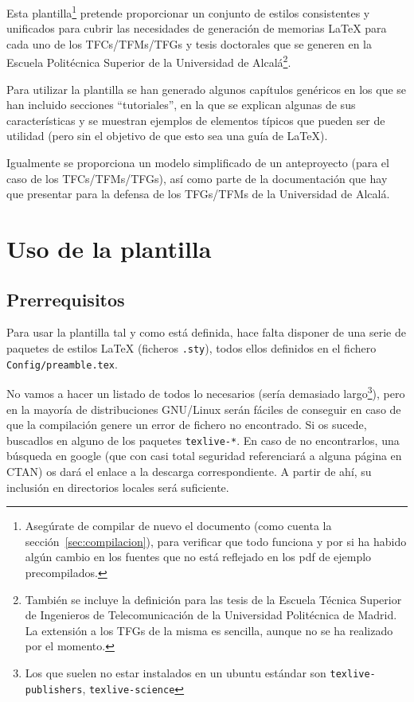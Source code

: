 \documentclass[spanish,openright]{book}
\begin{document}
Esta plantilla\footnote{Asegúrate de compilar de nuevo el documento
(como cuenta la sección~\ref{sec:compilacion}), para verificar que
todo funciona y por si ha habido algún cambio en los fuentes que no
está reflejado en los pdf de ejemplo precompilados.} pretende
proporcionar un conjunto de estilos consistentes y unificados para
cubrir las necesidades de generación de memorias \LaTeX{} para cada uno
de los TFCs/TFMs/TFGs y tesis doctorales que se generen en la Escuela
Politécnica Superior de la Universidad de Alcalá\footnote{También se
incluye la definición para las tesis de la Escuela Técnica Superior de
Ingenieros de Telecomunicación de la Universidad Politécnica de
Madrid. La extensión a los TFGs de la misma es sencilla, aunque no se
ha realizado por el momento.}.

Para utilizar la plantilla se han generado algunos capítulos genéricos
en los que se han incluido secciones ``tutoriales'', en la que se
explican algunas de sus características y se muestran ejemplos de
elementos típicos que pueden ser de utilidad (pero sin el objetivo de
que esto sea una guía de \LaTeX{}).

Igualmente se proporciona un modelo simplificado de un anteproyecto
(para el caso de los TFCs/TFMs/TFGs), así como parte de la documentación
que hay que presentar para la defensa de los TFGs/TFMs de la Universidad
de Alcalá.



\section{Uso de la plantilla}
\label{sec:uso-generico-de}


\subsection{Prerrequisitos}
\label{sec:prerrequisitos}

Para usar la plantilla tal y como está definida, hace falta disponer de
una serie de paquetes de estilos \LaTeX{} (ficheros \texttt{.sty}),
todos ellos definidos en el fichero \texttt{Config/preamble.tex}.

No vamos a hacer un listado de todos lo necesarios (sería demasiado
largo\footnote{Los que suelen no estar instalados en un ubuntu estándar
son \texttt{texlive-publishers}, \texttt{texlive-science}}), pero en
la mayoría de distribuciones GNU/Linux serán fáciles de conseguir en
caso de que la compilación genere un error de fichero no encontrado. Si
os sucede, buscadlos en alguno de los paquetes \texttt{texlive-*}. En
caso de no encontrarlos, una búsqueda en google (que con casi total
seguridad referenciará a alguna página en CTAN) os dará el enlace a la
descarga correspondiente. A partir de ahí, su inclusión en directorios
locales será suficiente.
\end{document}

